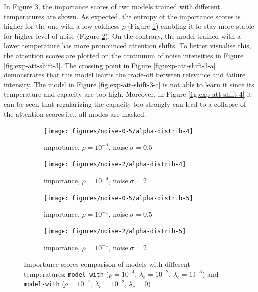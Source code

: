 In Figure \ref{fig:exp-att-shift-2}, the importance scores of two models trained with different temperatures are shown. As expected, the entropy of the importance scores is higher for the one with a low coldness $\rho$ (Figure \ref{fig:exp-att-shift-2-a}) enabling it to stay more stable for higher level of noise (Figure \ref{fig:exp-att-shift-2-b}). On the contrary, the model trained with a lower temperature has more pronounced attention shifts. To better visualise this, the attention scores are plotted on the continuum of noise intensities in Figure \ref{fig:exp-att-shift-3}. The crossing point in Figure \ref{fig:exp-att-shift-3-a} demonstrates that this model learns the trade-off between relevance and failure intensity. The model in Figure \ref{fig:exp-att-shift-3-c} is not able to learn it since its temperature and capacity are too high. Moreover, in Figure \ref{fig:exp-att-shift-4} it can be seen that regularizing the capacity too strongly can lead to a collapse of the attention scores i.e., all modes are masked.
\begin{figure}[!h]
\centering
\begin{subfigure}{.5\textwidth}
  \centering
  \texttt{[image: figures/noise-0-5/alpha-distrib-4]}
  \caption{importance, $\rho=10^{-4}$, noise $\sigma=0.5$} 
  \label{fig:exp-att-shift-2-a}
\end{subfigure}%
\begin{subfigure}{.5\textwidth}
  \centering
  \texttt{[image: figures/noise-2/alpha-distrib-4]}
  \caption{importance, $\rho=10^{-4}$, noise $\sigma=2$} 
  \label{fig:exp-att-shift-2-b}
\end{subfigure}
\begin{subfigure}{.5\textwidth}
  \centering
  \texttt{[image: figures/noise-0-5/alpha-distrib-5]}
  \caption{importance, $\rho=10^{-1}$, noise $\sigma=0.5$} 
\end{subfigure}%
\begin{subfigure}{.5\textwidth}
  \centering
  \texttt{[image: figures/noise-2/alpha-distrib-5]}
  \caption{importance, $\rho=10^{-1}$, noise $\sigma=2$} 
\end{subfigure}
\caption{Importance scores comparison of models with different temperatures: \texttt{model-with} ($\rho=10^{-4},\,\lambda_e=10^{-2},\,\lambda_c=10^{-3}$) and \texttt{model-with} ($\rho=10^{-1},\,\lambda_e=10^{-2},\,\lambda_c=0$)}
\label{fig:exp-att-shift-2}
\end{figure}


